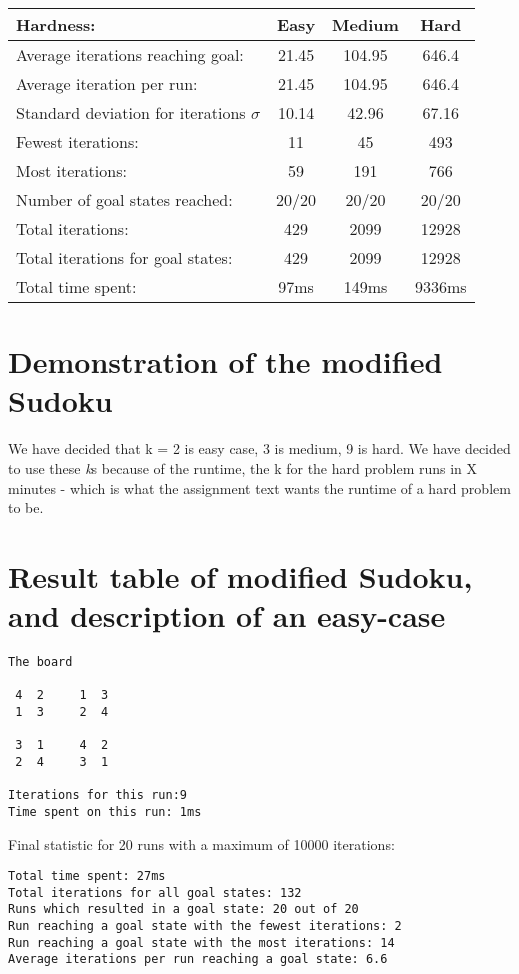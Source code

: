 \documentclass[12pt, a4paper]{article}
\begin{document}
\begin{center}
  \begin{tabular}{| l | c c c|}
    \hline
    Hardness: &\textbf{Easy} & \textbf{Medium} & \textbf{Hard} \\ \hline
    Average iterations reaching goal: & 21.45& 104.95& 646.4\\
    Average iteration per run:  & 21.45 & 104.95 &  646.4\\
    Standard deviation for iterations $\sigma$ & 10.14 & 42.96 & 67.16\\
    Fewest iterations: & 11 & 45& 493\\ 
    Most iterations: & 59 & 191& 766\\ 
    Number of goal states reached: & 20/20 & 20/20 & 20/20\\
    Total iterations: & 429 & 2099& 12928\\
    Total iterations for goal states: & 429 & 2099& 12928\\
    Total time spent: & 97ms& 149ms & 9336ms\\
    \hline
  \end{tabular}
\end{center}


\section{Demonstration of the modified Sudoku}
We have decided that k = 2 is easy case, 3 is medium, 9 is hard. 
We have decided to use these \textit{k}s because of the runtime, the k for the hard problem runs in X minutes - which is what the assignment text wants the runtime of a hard problem to be.

\section{Result table of modified Sudoku, and description of an easy-case}
\begin{verbatim}
The board

 4  2     1  3 
 1  3     2  4 

 3  1     4  2 
 2  4     3  1 
 
Iterations for this run:9
Time spent on this run: 1ms
\end{verbatim}

\noindent
Final statistic for 20 runs with a maximum of 10000 iterations:

\begin{verbatim}
Total time spent: 27ms
Total iterations for all goal states: 132
Runs which resulted in a goal state: 20 out of 20
Run reaching a goal state with the fewest iterations: 2
Run reaching a goal state with the most iterations: 14
Average iterations per run reaching a goal state: 6.6

\end{verbatim}
\end{document}
